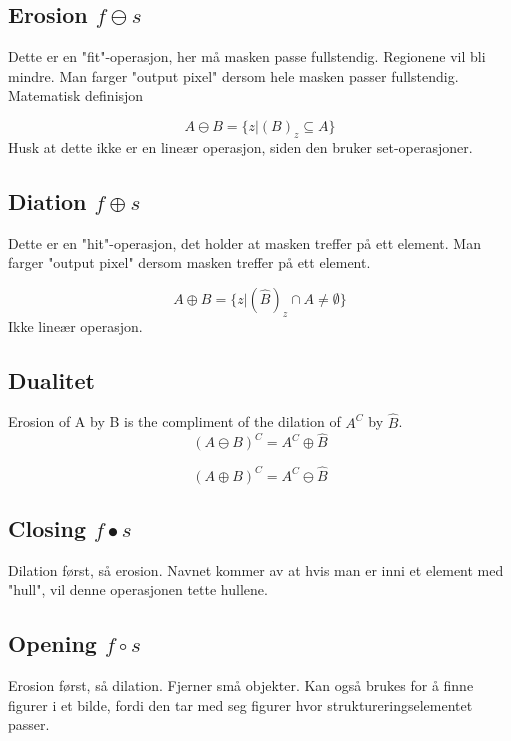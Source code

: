 \subsection{Erosion $f \ominus  s$}
Dette er en "fit"-operasjon, her må masken passe fullstendig. Regionene vil bli mindre. Man farger "output pixel" dersom hele masken passer fullstendig. Matematisk definisjon

\begin{equation}
    A \ominus  B = \{ z|(B)_z \subseteq A \}
\end{equation}
Husk at dette ikke er en lineær operasjon, siden den bruker set-operasjoner.

\subsection{Diation $f \oplus  s$}
Dette er en "hit"-operasjon, det holder at masken treffer på ett element. Man farger "output pixel" dersom masken treffer på ett element.

\begin{equation}
    A \oplus  B = \{ z|(\hat B)_z \cap A \neq \emptyset \}
\end{equation}
Ikke lineær operasjon.

\subsection{Dualitet}
Erosion of A by B is the compliment of the dilation of $A^C$ by $\hat B$.
\begin{equation}
    (A \ominus  B)^C = A^C \oplus \hat B
\end{equation}

\begin{equation}
    (A \oplus  B)^C = A^C \ominus \hat B
\end{equation}

\subsection{Closing $f \bullet  s$}
Dilation først, så erosion. Navnet kommer av at hvis man er inni et element med "hull", vil denne operasjonen tette hullene.

\subsection{Opening $f \circ  s$}
Erosion først, så dilation. Fjerner små objekter. Kan også brukes for å finne figurer i et bilde, fordi den tar med seg figurer hvor struktureringselementet passer.

